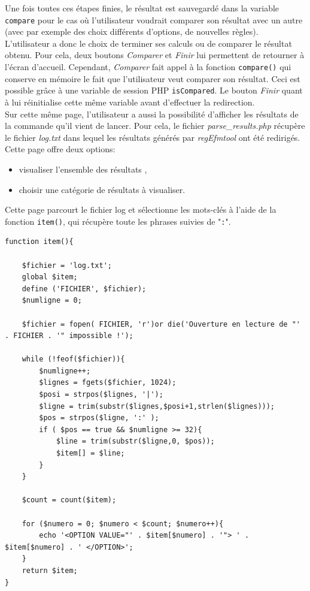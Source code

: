 Une fois toutes ces étapes finies, le résultat est sauvegardé dans la variable \texttt{compare} pour le cas où l'utilisateur voudrait comparer son résultat avec un autre (avec par exemple des choix différents d'options, de nouvelles règles).\\

L'utilisateur a donc le choix de terminer ses calculs ou de comparer le résultat obtenu. Pour cela, deux boutons \textit{Comparer} et \textit{Finir} lui permettent de retourner à l'écran d'accueil. Cependant, \textit{Comparer} fait appel à la fonction \texttt{compare()}  qui conserve en mémoire le fait que l'utilisateur veut comparer son résultat. Ceci est possible grâce à une variable de session PHP \texttt{isCompared}. Le bouton \textit{Finir} quant à lui réinitialise cette m\^eme variable avant d'effectuer la redirection.\\

Sur cette même page, l'utilisateur a aussi la possibilité d'afficher les résultats de la commande qu'il vient de lancer. Pour cela, le fichier \emph{parse\_results.php} récupère le fichier \emph{log.txt} dans lequel les résultats générés par \textit{regEfmtool} ont été redirigés. \\

Cette page offre deux options:
\begin{itemize}
\item visualiser l'ensemble des résultats ,
\item choisir une catégorie de résultats à visualiser.
\end{itemize}

Cette page parcourt le fichier log et sélectionne les mots-clés à l'aide de la fonction \texttt{item()}, qui récupère toute les phrases suivies de "\texttt{:}".

\begin{DDbox}{\linewidth}
\begin{lstlisting}
function item(){
					
	$fichier = 'log.txt';
	global $item;
	define ('FICHIER', $fichier);
	$numligne = 0;

	$fichier = fopen( FICHIER, 'r')or die('Ouverture en lecture de "' . FICHIER . '" impossible !');
					
	while (!feof($fichier)){
		$numligne++;
		$lignes = fgets($fichier, 1024);
		$posi = strpos($lignes, '|'); 
		$ligne = trim(substr($lignes,$posi+1,strlen($lignes))); 
		$pos = strpos($ligne, ':' );
		if ( $pos == true && $numligne >= 32){
			$line = trim(substr($ligne,0, $pos)); 
			$item[] = $line;
		}
	}
					
	$count = count($item);
					
	for ($numero = 0; $numero < $count; $numero++){
		echo '<OPTION VALUE="' . $item[$numero] . '"> ' . $item[$numero] . ' </OPTION>'; 
	}
	return $item;
}
\end{lstlisting}
\end{DDbox}

